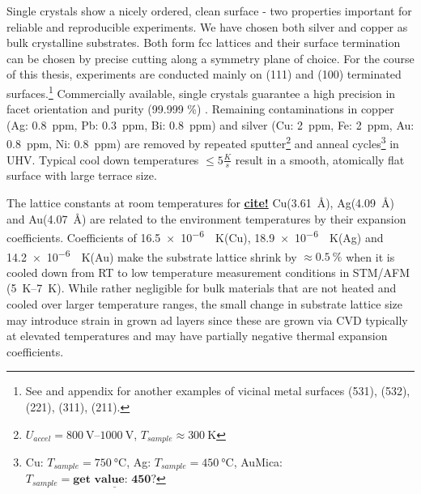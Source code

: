 Single crystals show a nicely ordered, clean surface - two properties important for reliable and reproducible experiments. We have chosen both silver and copper as bulk crystalline substrates. Both form fcc lattices and their surface termination can be chosen by precise cutting along a symmetry plane of choice. For the course of this thesis, experiments are conducted mainly on (111) and (100) terminated surfaces.\footnote{See \cite{riemann_ionic_2002} and appendix  for another examples of vicinal metal surfaces (531), (532), (221), (311), (211).} Commercially available, single crystals guarantee a high precision in facet orientation and purity (99.999 \%) \cite{mateck}. Remaining contaminations in copper (Ag: \SI{0.8}{ppm}, Pb: \SI{0.3}{ppm}, Bi: \SI{0.8}{ppm}) and silver (Cu: \SI{2}{ppm}, Fe: \SI{2}{ppm}, Au: \SI{0.8}{ppm}, Ni: \SI{0.8}{ppm}) are removed by repeated sputter\footnote{$U_{accel}=\SIrange{800}{1000}{\volt}$, $T_{sample}\approx \SI{300}{\kelvin}$} and anneal cycles\footnote{Cu: $T_{sample}=\SI{750}{\celsius}$, Ag: $T_{sample}=\SI{450}{\celsius}$, Au\/Mica: $T_{sample}= \underline{\textbf{get value: 450?}}$} in UHV. Typical cool down temperatures $\leq 5 \frac{K}{s}$ result in a smooth, atomically flat surface with large terrace size. 

The lattice constants at room temperatures for \underline{\textbf{cite!}} Cu(\SI{3,61}{\angstrom}), Ag(\SI{4,09}{\angstrom}) and Au(\SI{4,07}{\angstrom}) are related to the environment temperatures by their expansion coefficients.
Coefficients of \SI{16,5e-6}{\per \kelvin}(Cu), \SI{18,9e-6}{\per \kelvin}(Ag) and \SI{14,2e-6}{\per \kelvin}(Au) make the substrate lattice shrink by $\approx \SI{0,5}{\percent}$ when it is cooled down from RT to low temperature measurement conditions in STM/AFM (\SIrange{5}{7}{\kelvin}). While rather negligible for bulk materials that are not heated and cooled over larger temperature ranges, the small change in substrate lattice size may introduce strain in grown ad layers since these are grown via CVD typically at elevated temperatures and may have partially negative thermal expansion coefficients\cite{farwick_zum_hagen_structure_2016}.

